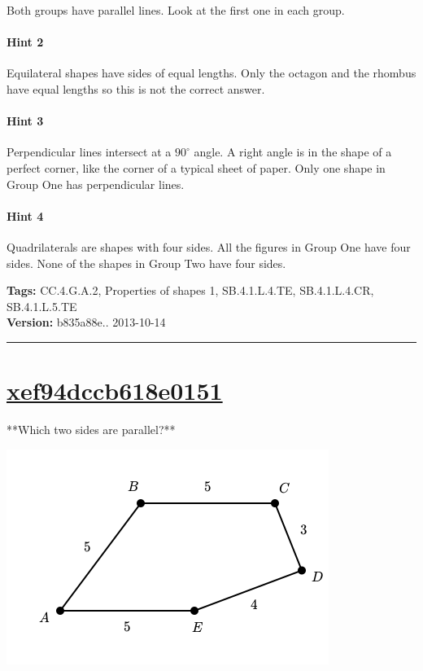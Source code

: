 \documentclass[twocolumn,10pt]{article}
\def\shrinkfactor{0.55}
\begin{document}
Both groups have parallel lines.  Look at the first one in each group.

\paragraph{Hint 2}Equilateral shapes have sides of equal lengths.  Only the octagon and the rhombus have equal lengths so this is not the correct answer.

\paragraph{Hint 3}Perpendicular lines intersect at a $90 ^\circ$ angle.
A right angle is in the shape of a perfect corner, like the corner of a typical sheet of paper.  Only one shape in Group One has perpendicular lines.

\paragraph{Hint 4}Quadrilaterals are shapes with four sides.  All the figures in Group One have four sides.  None of the shapes in Group Two have four sides.



\medskip
\noindent
\textbf{Tags:} {\footnotesize CC.4.G.A.2, Properties of shapes 1, SB.4.1.L.4.TE, SB.4.1.L.4.CR, SB.4.1.L.5.TE}\\
\textbf{Version:} b835a88e.. 2013-10-14
\smallskip\hrule





\section{\href{https://www.khanacademy.org/devadmin/content/items/xef94dccb618e0151}{xef94dccb618e0151}}

\noindent
**Which two sides are parallel?**


\includegraphics[scale=\shrinkfactor]{figures/0b1f52e2d56a98d5ec5f552c02f22f067ec40078.png}
\end{document}
